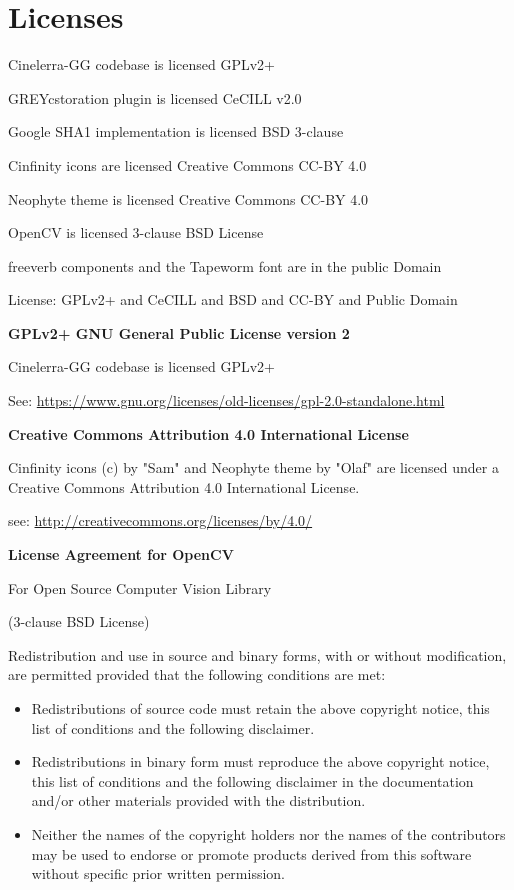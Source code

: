 \chapter{Licenses}%
\label{cha:licenses}

Cinelerra-GG codebase is licensed GPLv2+

GREYcstoration plugin is licensed CeCILL v2.0

Google SHA1 implementation is licensed BSD 3-clause

Cinfinity icons are licensed Creative Commons CC-BY 4.0

Neophyte theme is licensed Creative Commons CC-BY 4.0

OpenCV is licensed 3-clause BSD License

freeverb components and the Tapeworm font are in the public Domain

License: GPLv2+ and CeCILL and BSD and CC-BY and Public Domain

\vspace{2ex} \textbf{GPLv2+ \qquad   GNU General Public License version 2}

Cinelerra-GG codebase is licensed GPLv2+ 

\noindent See: {\small \url{https://www.gnu.org/licenses/old-licenses/gpl-2.0-standalone.html }}

\vspace{2ex} \textbf{Creative Commons Attribution 4.0 International License}

Cinfinity icons (c) by "Sam" and Neophyte theme by "Olaf" are licensed under a
Creative Commons Attribution 4.0 International License.

\noindent see: {\small \url{http://creativecommons.org/licenses/by/4.0/}}

\vspace{2ex} \textbf{License Agreement for OpenCV}

\begin{center}
For Open Source Computer Vision Library

(3-clause BSD License)
\end{center}

Redistribution and use in source and binary forms, with or without modification, are permitted provided that the following conditions are met:

\begin{itemize}
	\item Redistributions of source code must retain the above copyright notice, this list of conditions and the following disclaimer.
	\item Redistributions in binary form must reproduce the above copyright notice, this list of conditions and the following disclaimer in the documentation and/or other materials provided with the distribution.
	\item Neither the names of the copyright holders nor the names of the contributors may be used to endorse or promote products derived from this software without specific prior written permission.
\end{itemize}


